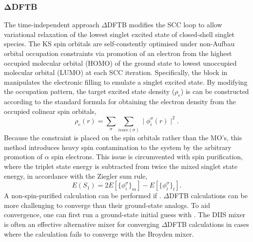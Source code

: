 \subsubsection{$\boldsymbol\Delta$DFTB}
The time-independent approach $\Delta$DFTB modifies the SCC loop to allow
variational relaxation of the lowest singlet excited state of closed-shell
singlet species.\cite{irle-JCTC-12-313} The KS spin orbitals are self-constently
optimised under non-Aufbau orbital occupation constraints via promotion of an
electron from the highest occupied molecular orbital (HOMO) of the ground state
to lowest unoccupied molecular orbital (LUMO) at each SCC
iteration. Specifically, the  block in \dftbp manipulates the
electronic filling to emulate a singlet excited state. By modifying the
occupation pattern, the target excited state density ($\rho_e$) is can be
constructed according to the standard formula for obtaining the electron density
from the occupied colinear spin orbitals,
\begin{equation*}
  \rho_e(r) = \sum_\sigma \sum_{i \epsilon occ(\sigma)}\mid\phi_i^\sigma(r)\mid^2.
\end{equation*}
Because the constraint is placed on the spin orbitals rather than the MO's, this
method introduces heavy spin contamination to the system by the arbitrary
promotion of $\alpha$ spin electrons.  This issue is circumvented with spin
purification, where the triplet state energy is subtracted from twice the mixed
singlet state energy, in accordance with the Ziegler sum
rule,\cite{baerends-TCA-43-261}
\begin{equation*}
  E(S_1) = 2E[\{\phi_i^\sigma\}_m]-E[\{\phi_i^\sigma\}_t].
\end{equation*}
A non-spin-purified calculation can be performed if .
$\Delta$DFTB calculations can be more challenging to converge than their
ground-state analogs. To aid convergence, one can first run a ground-state
initial guess with .  The DIIS mixer is often an effective
alternative mixer for converging $\Delta$DFTB calculations in cases where the
calculation fails to converge with the Broyden mixer.

\label{sec:dftbp.NonAufbau}

